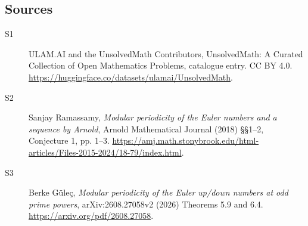 \documentclass[11pt]{article}
\begin{document}
\subsection{Sources}
\begin{description}
\item[\hypertarget{source:statement:1}{S1}] ULAM.AI and the UnsolvedMath Contributors, UnsolvedMath: A Curated Collection of Open Mathematics Problems, catalogue entry. CC BY 4.0. \url{https://huggingface.co/datasets/ulamai/UnsolvedMath}.
\item[\hypertarget{source:statement:2}{S2}] Sanjay Ramassamy, \emph{Modular periodicity of the Euler numbers and a sequence by Arnold}, Arnold Mathematical Journal (2018) \S\S1--2, Conjecture 1, pp. 1--3. \url{https://amj.math.stonybrook.edu/html-articles/Files-2015-2024/18-79/index.html}.
\item[\hypertarget{source:statement:3}{S3}] Berke G\"ule\c{c}, \emph{Modular periodicity of the Euler up/down numbers at odd prime powers}, arXiv:2608.27058v2 (2026) Theorems 5.9 and 6.4. \url{https://arxiv.org/pdf/2608.27058}.
\end{description}
\label{end:statement}
\end{document}

